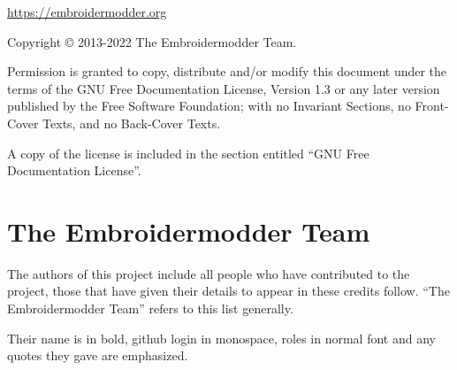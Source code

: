 \documentclass[a4paper, 11pt]{report}
\title{The Embroidermodder Project\\{\small \subtitle}}
\author{The Embroidermodder Team}
\begin{document}
\maketitle

\begin{center}
\vspace{3in}

\url{https://embroidermodder.org}

\vspace{0.5in}

Copyright \copyright{} 2013-2022 The Embroidermodder Team.

\vspace{0.5in}

Permission is granted to copy, distribute and/or modify this document
    under the terms of the GNU Free Documentation License, Version 1.3
    or any later version published by the Free Software Foundation;
    with no Invariant Sections, no Front-Cover Texts, and no Back-Cover Texts.

\vspace{0.5in}

A copy of the license is included in the section entitled ``GNU
    Free Documentation License''.
\end{center}

\pagebreak

\tableofcontents

\pagebreak

\section*{The Embroidermodder Team}

The authors of this project include all people who have contributed to the project, those that have given their details to appear in these credits follow. 
``The Embroidermodder Team'' refers to this list generally.

Their name is in bold, github login in monospace, roles in normal font and any quotes they gave are emphasized.
\end{document}
